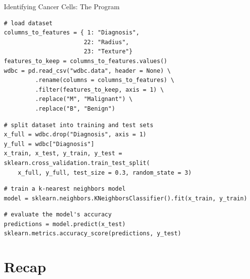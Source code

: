 \documentclass[8pt,aspectratio=169]{beamer}
\begin{document}
\begin{frame}[fragile]{Identifying Cancer Cells: The Program}

\pause
\begin{verbatim}
# load dataset
columns_to_features = { 1: "Diagnosis",
                       22: "Radius",
                       23: "Texture"}
features_to_keep = columns_to_features.values()
wdbc = pd.read_csv("wdbc.data", header = None) \
         .rename(columns = columns_to_features) \
         .filter(features_to_keep, axis = 1) \
         .replace("M", "Malignant") \
         .replace("B", "Benign")
\end{verbatim}

\pause
\begin{verbatim}
# split dataset into training and test sets
x_full = wdbc.drop("Diagnosis", axis = 1)
y_full = wdbc["Diagnosis"]
x_train, x_test, y_train, y_test = sklearn.cross_validation.train_test_split(
    x_full, y_full, test_size = 0.3, random_state = 3)
\end{verbatim}

\pause
\begin{verbatim}
# train a k-nearest neighbors model
model = sklearn.neighbors.KNeighborsClassifier().fit(x_train, y_train)
\end{verbatim}

\pause
\begin{verbatim}
# evaluate the model's accuracy
predictions = model.predict(x_test)
sklearn.metrics.accuracy_score(predictions, y_test)
\end{verbatim}

\end{frame}


\section{Recap}

\end{document}
